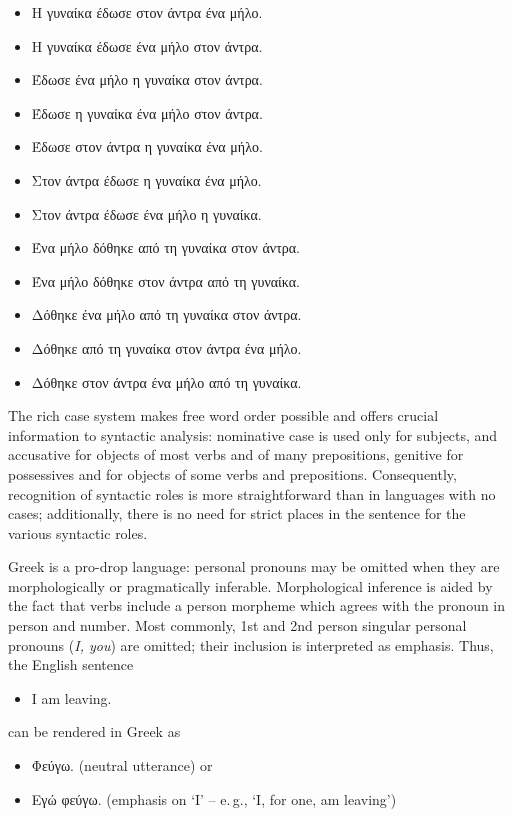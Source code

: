 \begin{multicols}{2}
\begin{itemize}    
\item Η γυναίκα έδωσε στον άντρα ένα μήλο.
\item Η γυναίκα έδωσε ένα μήλο στον άντρα.
\item Έδωσε ένα μήλο η γυναίκα στον άντρα.
\item Έδωσε η γυναίκα ένα μήλο στον άντρα.
\item Έδωσε στον άντρα η γυναίκα ένα μήλο.
\item Στον άντρα έδωσε η γυναίκα ένα μήλο.
\item Στον άντρα έδωσε ένα μήλο η γυναίκα.
\item Ένα μήλο δόθηκε από τη γυναίκα στον άντρα.
\item Ένα μήλο δόθηκε στον άντρα από τη γυναίκα.
\item Δόθηκε ένα μήλο από τη γυναίκα στον άντρα.
\item Δόθηκε από τη γυναίκα στον άντρα ένα μήλο.
\item Δόθηκε στον άντρα ένα μήλο από τη γυναίκα.
\end{itemize}
 
The rich case system makes free word order possible and offers crucial information to syntactic analysis: nominative case is used only for subjects, and accusative for objects of most verbs and of many prepositions, genitive for possessives and for objects of some verbs and prepositions. Consequently, recognition of syntactic roles is more straightforward than in languages with no cases; additionally, there is no need for strict places in the sentence for the various syntactic roles.

Greek is a pro-drop language: personal pronouns may be omitted when they are morphologically or pragmatically inferable. Morphological inference is aided by the fact that verbs include a person morpheme which agrees with the pronoun in person and number. Most commonly, 1st and 2nd person singular personal pronouns (\textit{I, you}) are omitted; their inclusion is interpreted as emphasis. Thus, the English sentence 

\begin{itemize}
\item[] I am leaving.
\end{itemize}

can be rendered in Greek as

\begin{itemize}
\item Φεύγω. (neutral utterance) or 
\item Εγώ φεύγω. (emphasis on ‘I’ – e.\,g., ‘I, for one, am leaving’)
\end{itemize}


\end{multicols}
